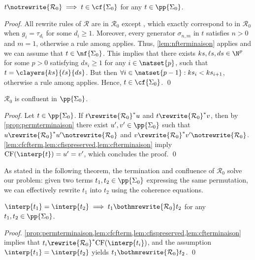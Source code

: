 \begin{lemma}\label{lem:cfterminaison}
    $t\notrewrite{\mathcal{R}_0}\implies t\in \cf{\Sigma_0}$ for any $t\in \pp{\Sigma_0}$.
\end{lemma}
\begin{proof}
    All rewrite rules of $\mathcal{R}$ are in $\mathcal{R}_0$ except , which exactly correspond to  in $\mathcal{R}_0$ when $g_i=\tau_{d_i}$ for some $d_i\ge1$. Moreover, every generator $\sigma_{n,m}$ in $t$ satisfies $n>0$ and $m=1$, otherwise a rule among  applies. Thus, \cref{lem:nfterminaison} applies and we can assume that $t\in \nf{\Sigma_0}$. This implies that there exists $ks,\ell s,ds\in\N^p$ for some $p>0$ satisfying $ds_i\ge1$ for any $i\in\natset{p}$, such that $t=\clayers{ks}{\ell s}{ds}$. But then $\forall i\in\natset{p-1}:ks_i<ks_{i+1}$, otherwise a rule among  applies. Hence, $t\in \cf{\Sigma_0}$. \qed
\end{proof}

\begin{proposition}\label{prop:permconfluence}
    $\mathcal{R}_0$ is confluent in $\pp{\Sigma_0}$.
\end{proposition}
\begin{proof}
    Let $t\in\pp{\Sigma_0}$. If $t\rewrite{\mathcal{R}_0}^*u$ and $t\rewrite{\mathcal{R}_0}^*v$, then by \cref{prop:permterminaison} there exist $u',v'\in\pp{\Sigma_0}$ such that $u\rewrite{\mathcal{R}_0}^*u'\notrewrite{\mathcal{R}_0}$ and $v\rewrite{\mathcal{R}_0}^*v'\notrewrite{\mathcal{R}_0}$. \cref{lem:cfcfterm,lem:cfispreserved,lem:cfterminaison} imply $\textup{CF}(\interp{t})=u'=v'$, which concludes the proof. \qed
\end{proof}

As stated in the following theorem, the termination and confluence of $\mathcal{R}_0$ solve our problem: given two terms $t_1,t_2\in\pp{\Sigma_0}$ expressing the same permutation, we can effectively rewrite $t_1$ into $t_2$ using the coherence equations.

\begin{theorem}\label{th:swap}
    $\interp{t_1}=\interp{t_2}\implies t_1\bothmrewrite{\mathcal{R}_0} t_2$ for any $t_1,t_2\in\pp{\Sigma_0}$.
\end{theorem}
\begin{proof}
    \cref{prop:permterminaison,lem:cfcfterm,lem:cfispreserved,lem:cfterminaison} implies that $t_i\rewrite{\mathcal{R}_0}^*\textup{CF}(\interp{t_i})$, and the assumption $\interp{t_1}=\interp{t_2}$ yields $t_1\bothmrewrite{\mathcal{R}_0} t_2$. \qed
\end{proof}